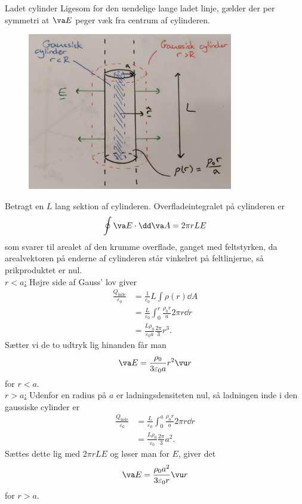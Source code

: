 \begin{opgave}{Ladet cylinder}
    \opg Ligesom for den uendelige lange ladet linje, gælder der per symmetri at $\va E$ peger væk fra centrum af cylinderen.
    \begin{figure}[H]
        \centering
        \includegraphics[width=0.8\textwidth]{facit/figurer/elektro/elektro_opg9,1.jpg}
    \end{figure}
    Betragt en $L$ lang sektion af cylinderen. Overfladeintegralet på cylinderen er
    \[ \oint \va E\cdot \dd\va A=2\pi rLE \]
    som svarer til arealet af den krumme overflade, ganget med feltstyrken, da arealvektoren på enderne af cylinderen står vinkelret på feltlinjerne, så prikproduktet er nul.\\[12pt]
    \underline{$r<a$:} Højre side af Gauss' lov giver
    \begin{align*}
        \frac{Q_\text{inde}}{\varepsilon_0}&=\frac{1}{\varepsilon_0}L\int\rho(r)\dd A\\
        &=\frac{L}{\varepsilon_0}\int_0^r\frac{\rho_0r}{a}2\pi r\dd r\\
        &=\frac{L\rho_0}{\varepsilon_0a}\frac{2\pi}{3}r^3.
    \end{align*}
    Sætter vi de to udtryk lig hinanden får man
    \[ \va E=\frac{\rho_0}{3\varepsilon_0a}r^2\vu r \]
    for $r<a$.\\[12pt]
    \underline{$r>a$:} Udenfor en radius på $a$ er ladningsdensiteten nul, så ladningen inde i den gaussiske cylinder er
    \begin{align*}
        \frac{Q_\text{inde}}{\varepsilon_0}&=\frac{L}{\varepsilon_0}\int_0^a\frac{\rho_0r}{a}2\pi r\dd r\\
        &=\frac{L\rho_0}{\varepsilon_0}\frac{2\pi}{3}a^2.
    \end{align*}
    Sættes dette lig med $2\pi rLE$ og løser man for $E$, giver det
    \[ \va E=\frac{\rho_0 a^2}{3\varepsilon_0 r}\vu r \]
    for $r>a$.
\end{opgave}

